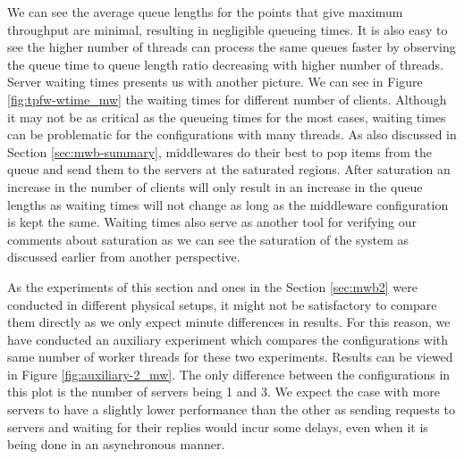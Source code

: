 \documentclass[11pt,a4paper]{article}
\begin{document}
\par We can see the average queue lengths for the points that give maximum throughput are minimal, resulting in negligible queueing times. It is also easy to see the higher number of threads can process the same queues faster by observing the queue time to queue length ratio decreasing with higher number of threads. Server waiting times presents us with another picture. We can see in Figure \ref{fig:tpfw-wtime_mw} the waiting times for different number of clients. Although it may not be as critical as the queueing times for the most cases, waiting times can be problematic for the configurations with many threads. As also discussed in Section \ref{sec:mwb-summary}, middlewares do their best to pop items from the queue and send them to the servers at the saturated regions. After saturation an increase in the number of clients will only result in an increase in the queue lengths as waiting times will not change as long as the middleware configuration is kept the same. Waiting times also serve as another tool for verifying our comments about saturation as we can see the saturation of the system as discussed earlier from another perspective.
\par As the experiments of this section and ones in the Section \ref{sec:mwb2} were conducted in different physical setups, it might not be satisfactory to compare them directly as we only expect minute differences in results. For this reason, we have conducted an auxiliary experiment which compares the configurations with same number of worker threads for these two experiments. Results can be viewed in Figure \ref{fig:auxiliary-2_mw}. The only difference between the configurations in this plot is the number of servers being 1 and 3. We expect the case with more servers to have a slightly lower performance than the other as sending requests to servers and waiting for their replies would incur some delays, even when it is being done in an asynchronous manner.
\end{document}
